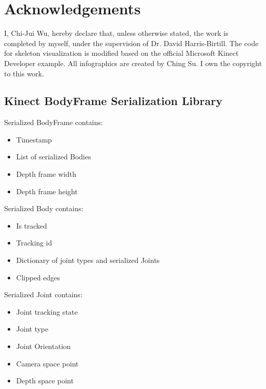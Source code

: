 \documentclass{sigchi}
\begin{document}
\section{Acknowledgements}
\label{sec:acknowledge}

I, Chi-Jui Wu, hereby declare that, unless otherwise stated, the work is completed by myself, under the supervision of Dr. David Harris-Birtill. The code for skeleton visualization is modified based on the official Microsoft Kinect Developer example.
All infographics are created by Ching Su. I own the copyright to this work.

\balance{}




\newpage
\begin{appendices}

\section{Kinect BodyFrame Serialization Library}
\label{sec:bodyframe_serialization}

Serialized BodyFrame contains:

\begin{itemize}
  \item Timestamp
  \item List of serialized Bodies
  \item Depth frame width
  \item Depth frame height
\end{itemize}

Serialized Body contains:

\begin{itemize}
  \item Is tracked
  \item Tracking id
  \item Dictionary of joint types and serialized Joints
  \item Clipped edges
\end{itemize}

Serialized Joint contains:

\begin{itemize}
  \item Joint tracking state
  \item Joint type
  \item Joint Orientation
  \item Camera space point
  \item Depth space point
\end{itemize}

\end{appendices}
\end{document}
